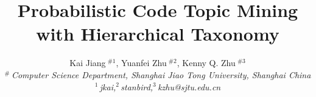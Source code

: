 \documentclass[10pt,conference,letterpaper]{IEEEtran}
\begin{document}
\title{Probabilistic Code Topic Mining with Hierarchical Taxonomy}

\author{%
{Kai Jiang{\small $~^{\#1}$}, Yuanfei Zhu{\small $~^{\#2}$}, Kenny Q. Zhu{\small $~^{\#3}$} }%
\vspace{1.6mm}\\
\fontsize{10}{10}\selectfont\itshape
$^{\#}$\,Computer Science Department, Shanghai Jiao Tong University, Shanghai China\\
\fontsize{9}{9}\selectfont\ttfamily\upshape
%
$^{1}$\,jkai,$^{2}$\,stanbird,$^{3}$\,kzhu@sjtu.edu.cn\\
}
\maketitle
\end{document}
